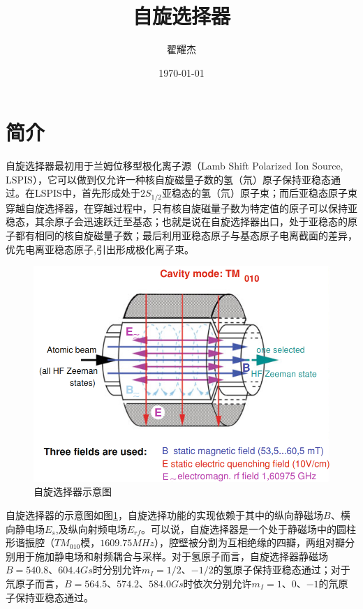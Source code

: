 \documentclass[UTF8]{ctexart}
\title{\heiti 自旋选择器}
\author{翟耀杰}
\date{\today}
\begin{document}
\maketitle
\section{简介}
自旋选择器最初用于兰姆位移型极化离子源（Lamb Shift Polarized Ion Source, LSPIS）\cite{1969Source}，它可以做到仅允许一种核自旋磁量子数的氢（氘）原子保持亚稳态通过。在LSPIS中，首先形成处于$2S_{1/2}$亚稳态的氢（氘）原子束；而后亚稳态原子束穿越自旋选择器，在穿越过程中，只有核自旋磁量子数为特定值的原子可以保持亚稳态，其余原子会迅速跃迁至基态；也就是说在自旋选择器出口，处于亚稳态的原子都有相同的核自旋磁量子数；最后利用亚稳态原子与基态原子电离截面的差异，优先电离亚稳态原子,引出形成极化离子束。
\begin{figure}[ht]
\centering
\includegraphics[scale=0.6]{SpinFilterScheme.png}
\caption{自旋选择器示意图}
\label{fig:SFS}
\end{figure}

自旋选择器的示意图如图\ref{fig:SFS}，自旋选择功能的实现依赖于其中的纵向静磁场$B$、横向静电场$E_s$,及纵向射频电场$E_{rf}$。可以说，自旋选择器是一个处于静磁场中的圆柱形谐振腔（$TM_{010}$模，$1609.75MHz$），腔壁被分割为互相绝缘的四瓣，两组对瓣分别用于施加静电场和射频耦合与采样。对于氢原子而言，自旋选择器静磁场$B=540.8$、$604.4Gs$时分别允许$m_I=1/2$、$-1/2$的氢原子保持亚稳态通过；对于氘原子而言，$B=564.5$、$574.2$、$584.0Gs$时依次分别允许$m_I=1$、$0$、$-1$的氘原子保持亚稳态通过。
\end{document}
